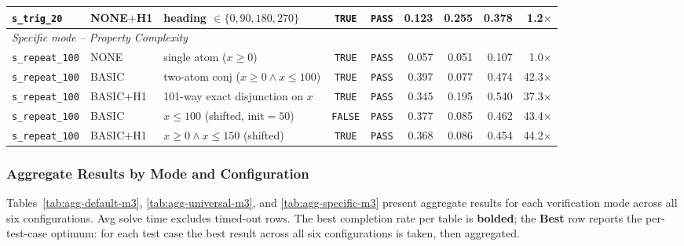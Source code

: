 {\begin{longtable}{p{} p{} p{} c c r r r r}
\texttt{s\_trig\_20} & NONE$+$H1 & heading $\in \{0,90,180,270\}$ & \texttt{TRUE} & \texttt{PASS} & 0.123 & 0.255 & 0.378 & 1.2$\times$ \\
\midrule
\multicolumn{9}{l}{\textit{Specific mode -- Property Complexity}} \\
\midrule
\texttt{s\_repeat\_100} & NONE & single atom ($x \geq 0$) & \texttt{TRUE} & \texttt{PASS} & 0.057 & 0.051 & 0.107 & 1.0$\times$ \\
\texttt{s\_repeat\_100} & BASIC & two-atom conj ($x \geq 0 \land x \leq 100$) & \texttt{TRUE} & \texttt{PASS} & 0.397 & 0.077 & 0.474 & 42.3$\times$ \\
\texttt{s\_repeat\_100} & BASIC$+$H1 & 101-way exact disjunction on $x$ & \texttt{TRUE} & \texttt{PASS} & 0.345 & 0.195 & 0.540 & 37.3$\times$ \\
\texttt{s\_repeat\_100} & BASIC & $x \leq 100$ (shifted, init$=50$) & \texttt{FALSE} & \texttt{PASS} & 0.377 & 0.085 & 0.462 & 43.4$\times$ \\
\texttt{s\_repeat\_100} & BASIC$+$H1 & $x \geq 0 \land x \leq 150$ (shifted) & \texttt{TRUE} & \texttt{PASS} & 0.368 & 0.086 & 0.454 & 44.2$\times$ \\
\end{longtable}
}

\subsubsection*{Aggregate Results by Mode and Configuration}

Tables~\ref{tab:agg-default-m3}, \ref{tab:agg-universal-m3}, and \ref{tab:agg-specific-m3} present aggregate results for each verification mode across all six configurations.  Avg solve time excludes timed-out rows.  The best completion rate per table is \textbf{bolded}; the \textbf{Best} row reports the per-test-case optimum: for each test case the best result across all six configurations is taken, then aggregated.

